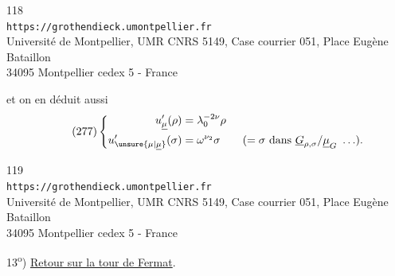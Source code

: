 
\begin{center}
\small
118\\
\texttt{https://grothendieck.umontpellier.fr}\\
Université de Montpellier, UMR CNRS 5149, Case courrier 051, Place Eugène Bataillon\\
34095 Montpellier cedex 5 - France
\end{center}


et on en déduit aussi
\[
\tag{277}
\left\{
\begin{aligned}
u'_{\underline{\mu}}(\rho)&=\lambda_0^{-2\nu}\rho\\
u'_{\unsure{\mu|\underline{\mu}}}(\sigma)&=\omega^{\nu_2}\sigma
\qquad (=\sigma\text{ dans }\underline G_{\rho,\sigma}/\underline{\mu}_G\ \ldots).
\end{aligned}
\right.
\]


\begin{center}
\small
119\\
\texttt{https://grothendieck.umontpellier.fr}\\
Université de Montpellier, UMR CNRS 5149, Case courrier 051, Place Eugène Bataillon\\
34095 Montpellier cedex 5 - France
\end{center}


13\textsuperscript{o}) \uline{Retour sur la tour de Fermat}.

